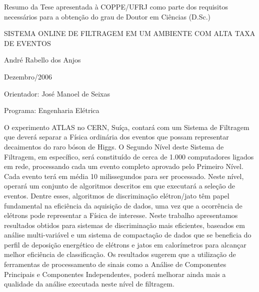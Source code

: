 \newenvironment{summary}[1]{%
\begin{minipage}{\linewidth}%
\newcommand{\saveparameter}{\baselinestretch}%
\renewcommand{\baselinestretch}{#1}%
\normalsize}%
{%
\renewcommand{\baselinestretch}{\saveparameter}%
\end{minipage}%
}

\noindent
Resumo da Tese apresentada à COPPE/UFRJ como parte dos requisitos necessários
para a obtenção do grau de Doutor em Ciências (D.Sc.)

\vspace{1.5cm}

\begin{center}
SISTEMA ONLINE DE FILTRAGEM EM UM AMBIENTE COM ALTA TAXA DE EVENTOS
\vspace{1cm}

André Rabello dos Anjos
\vspace{1cm}

Dezembro/2006
\end{center}
\vspace{1.5cm}

\noindent
Orientador: José Manoel de Seixas
\vspace{1.5cm}

\noindent
Programa: Engenharia Elétrica
\vspace{2cm}

\begin{summary}{1.2}
\hspace{0.8cm}O experimento ATLAS no CERN, Suíça, contará com um Sistema de
Filtragem que deverá separar a Física ordinária dos eventos que possam
representar decaimentos do raro bóson de Higgs. O Segundo Nível deste Sistema
de Filtragem, em específico, será constituído de cerca de 1.000 computadores
ligados em rede, processando cada um evento completo aprovado pelo Primeiro
Nível. Cada evento terá em média 10 milissegundos para ser processado.  Neste
nível, operará um conjunto de algoritmos descritos em  que
executará a seleção de eventos. Dentre esses, algoritmos de discriminação
elétron/jato têm papel fundamental na eficiência da aquisição de dados, uma
vez que a ocorrência de elétrons pode representar a Física de interesse. Neste
trabalho apresentamos resultados obtidos para sistemas de discriminação mais
eficientes, baseados em análise multi-variável e um sistema de compactação
de dados que se beneficia do perfil de deposição energético de elétrons e
jatos em calorímetros para alcançar melhor eficiência de classificação. Os
resultados sugerem que a utilização de ferramentas de processamento de sinais
como a Análise de Componentes Principais e Componentes Independentes, poderá
melhorar ainda mais a qualidade da análise executada neste nível de filtragem.
\end{summary}

